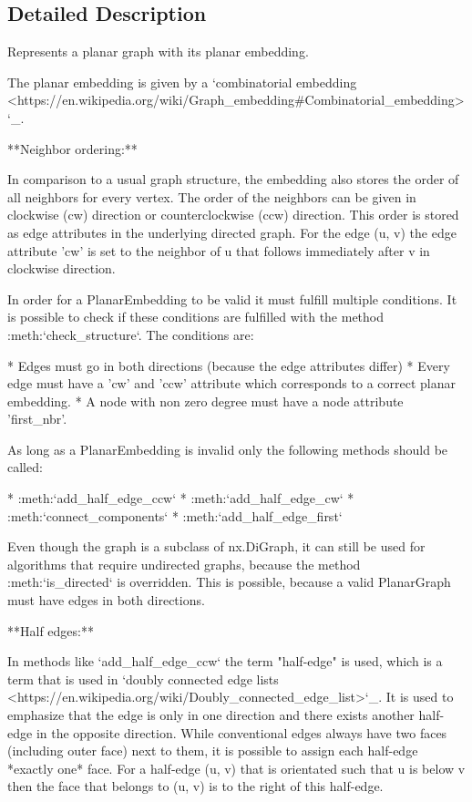 \subsection{Detailed Description}
\begin{DoxyVerb}Represents a planar graph with its planar embedding.

The planar embedding is given by a `combinatorial embedding
<https://en.wikipedia.org/wiki/Graph_embedding#Combinatorial_embedding>`_.

**Neighbor ordering:**

In comparison to a usual graph structure, the embedding also stores the
order of all neighbors for every vertex.
The order of the neighbors can be given in clockwise (cw) direction or
counterclockwise (ccw) direction. This order is stored as edge attributes
in the underlying directed graph. For the edge (u, v) the edge attribute
'cw' is set to the neighbor of u that follows immediately after v in
clockwise direction.

In order for a PlanarEmbedding to be valid it must fulfill multiple
conditions. It is possible to check if these conditions are fulfilled with
the method :meth:`check_structure`.
The conditions are:

* Edges must go in both directions (because the edge attributes differ)
* Every edge must have a 'cw' and 'ccw' attribute which corresponds to a
  correct planar embedding.
* A node with non zero degree must have a node attribute 'first_nbr'.

As long as a PlanarEmbedding is invalid only the following methods should
be called:

* :meth:`add_half_edge_ccw`
* :meth:`add_half_edge_cw`
* :meth:`connect_components`
* :meth:`add_half_edge_first`

Even though the graph is a subclass of nx.DiGraph, it can still be used
for algorithms that require undirected graphs, because the method
:meth:`is_directed` is overridden. This is possible, because a valid
PlanarGraph must have edges in both directions.

**Half edges:**

In methods like `add_half_edge_ccw` the term "half-edge" is used, which is
a term that is used in `doubly connected edge lists
<https://en.wikipedia.org/wiki/Doubly_connected_edge_list>`_. It is used
to emphasize that the edge is only in one direction and there exists
another half-edge in the opposite direction.
While conventional edges always have two faces (including outer face) next
to them, it is possible to assign each half-edge *exactly one* face.
For a half-edge (u, v) that is orientated such that u is below v then the
face that belongs to (u, v) is to the right of this half-edge.


\end{DoxyVerb}
